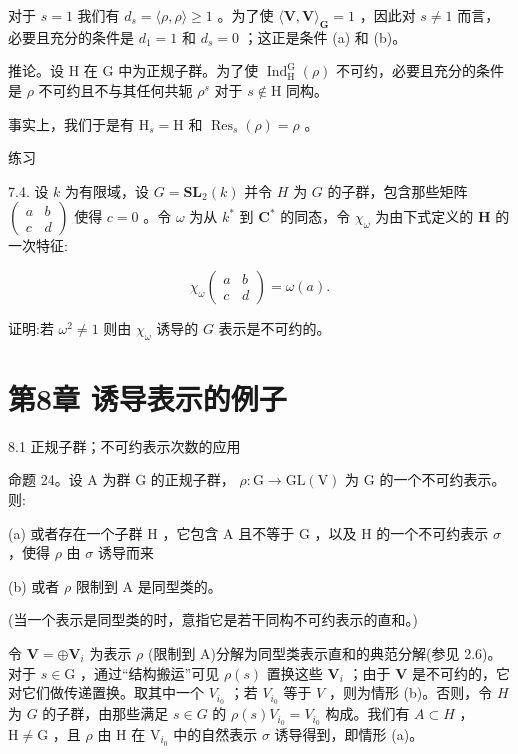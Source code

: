 \documentclass[10pt]{article}
\begin{document}
对于 \(s = 1\) 我们有 \({d}_{s} = \langle \rho ,\rho \rangle  \geq  1\) 。为了使 \(\langle \mathbf{V},\mathbf{V}{\rangle }_{\mathbf{G}} = 1\) ，因此对 \(s \neq  1\) 而言，必要且充分的条件是 \({d}_{1} = 1\) 和 \({d}_{s} = 0\) ；这正是条件 (a) 和 (b)。

推论。设 \(\mathrm{H}\) 在 \(\mathrm{G}\) 中为正规子群。为了使 \({\operatorname{Ind}}_{\mathrm{H}}^{\mathrm{G}}\left( \rho \right)\) 不可约，必要且充分的条件是 \(\rho\) 不可约且不与其任何共轭 \({\rho }^{s}\) 对于 \(s \notin  \mathrm{H}\) 同构。

事实上，我们于是有 \({\mathrm{H}}_{s} = \mathrm{H}\) 和 \({\operatorname{Res}}_{s}\left( \rho \right)  = \rho\) 。

练习

7.4. 设 \(k\) 为有限域，设 \(G = {\mathbf{{SL}}}_{2}\left( k\right)\) 并令 \(H\) 为 \(G\) 的子群，包含那些矩阵 \(\left( \begin{array}{ll} a & b \\  c & d \end{array}\right)\) 使得 \(c = 0\) 。令 \(\omega\) 为从 \({k}^{ * }\) 到 \({\mathbf{C}}^{ * }\) 的同态，令 \({\chi }_{\omega }\) 为由下式定义的 \(\mathbf{H}\) 的一次特征:

\[
{\chi }_{\omega }\left( \begin{array}{ll} a & b \\  c & d \end{array}\right)  = \omega \left( a\right) .
\]

证明:若 \({\omega }^{2} \neq  1\) 则由 \({\chi }_{\omega }\) 诱导的 \(G\) 表示是不可约的。

\section*{第8章 诱导表示的例子}

8.1 正规子群；不可约表示次数的应用

命题 24。设 A 为群 G 的正规子群， \(\rho  : \mathrm{G} \rightarrow  \mathrm{{GL}}\left( \mathrm{V}\right)\) 为 \(\mathrm{G}\) 的一个不可约表示。则:

(a) 或者存在一个子群 \(\mathrm{H}\) ，它包含 A 且不等于 \(\mathrm{G}\) ，以及 \(\mathrm{H}\) 的一个不可约表示 \(\sigma\) ，使得 \(\rho\) 由 \(\sigma\) 诱导而来

(b) 或者 \(\rho\) 限制到 \(\mathrm{A}\) 是同型类的。

(当一个表示是同型类的时，意指它是若干同构不可约表示的直和。)

令 \(\mathbf{V} =  \oplus  {\mathbf{V}}_{i}\) 为表示 \(\rho\) (限制到 A)分解为同型类表示直和的典范分解(参见 2.6)。对于 \(s \in  \mathrm{G}\) ，通过“结构搬运”可见 \(\rho \left( s\right)\) 置换这些 \({\mathbf{V}}_{i}\) ；由于 \(\mathbf{V}\) 是不可约的，它对它们做传递置换。取其中一个 \({V}_{{i}_{0}}\) ；若 \({V}_{{i}_{0}}\) 等于 \(V\) ，则为情形 (b)。否则，令 \(H\) 为 \(G\) 的子群，由那些满足 \(s \in  G\) 的 \(\rho \left( s\right) {V}_{{i}_{0}} = {V}_{{i}_{0}}\) 构成。我们有 \(A \subset  H\) ， \(\mathrm{H} \neq  \mathrm{G}\) ，且 \(\rho\) 由 \(\mathrm{H}\) 在 \({\mathrm{V}}_{{i}_{0}}\) 中的自然表示 \(\sigma\) 诱导得到，即情形 (a)。
\end{document}
